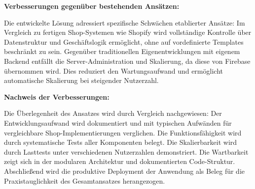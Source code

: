 \documentclass{scrartcl}
\begin{document}
\noindent
\textbf{Verbesserungen gegenüber bestehenden Ansätzen:}

\noindent
Die entwickelte Lösung adressiert spezifische Schwächen etablierter Ansätze: Im Vergleich zu fertigen Shop-Systemen wie Shopify wird vollständige Kontrolle über Datenstruktur und Geschäftslogik ermöglicht, ohne auf vordefinierte Templates beschränkt zu sein. Gegenüber traditionellen Eigenentwicklungen mit eigenem Backend entfällt die Server-Administration und Skalierung, da diese von Firebase übernommen wird. Dies reduziert den Wartungsaufwand und ermöglicht automatische Skalierung bei steigender Nutzerzahl.
\newline\newline

\noindent
\textbf{Nachweis der Verbesserungen:}

\noindent
Die Überlegenheit des Ansatzes wird durch Vergleich nachgewiesen: Der Entwicklungsaufwand wird dokumentiert und mit typischen Aufwänden für vergleichbare Shop-Implementierungen verglichen. Die Funktionsfähigkeit wird durch systematische Tests aller Komponenten belegt. Die Skalierbarkeit wird durch Lasttests unter verschiedenen Nutzerzahlen demonstriert. Die Wartbarkeit zeigt sich in der modularen Architektur und dokumentierten Code-Struktur. Abschließend wird die produktive Deployment der Anwendung als Beleg für die Praxistauglichkeit des Gesamtansatzes herangezogen.
\end{document}
